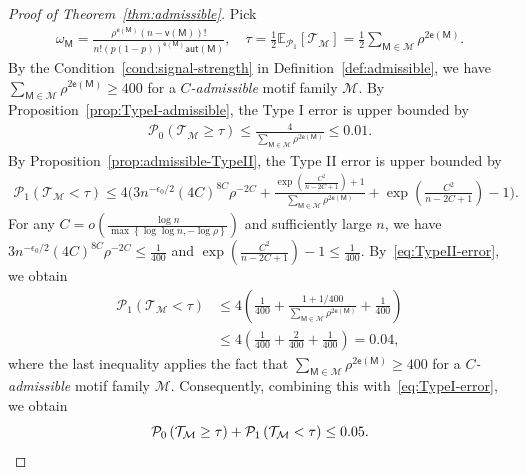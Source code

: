 \documentclass[letterpaper,11pt]{article}
\theoremstyle{definition}
\newcommand{\maM}{\mathcal{M}}
\newcommand{\maP}{\mathcal{P}}
\newcommand{\maT}{\mathcal{T}}
\newcommand{\en}{\mathsf{{e}}}
\newcommand{\vn}{\mathsf{{v}}}
\newcommand{\pth}[1]{\left( #1 \right)}
\newcommand{\qth}[1]{\left[ #1 \right]}
\newcommand{\sth}[1]{\left\{ #1 \right\}}
\newcommand{\sfM}{{\mathsf{M}}}
\newcommand{\aut}{\mathsf{aut}}
\def\E{\mathbb{E}}
\begin{document}
\begin{proof}[Proof of Theorem~\ref{thm:admissible}]
Pick \begin{align*}
    \omega_\sfM = \frac{\rho^{\en(\sfM)}(n-\vn(\sfM))!}{n!(p(1-p))^{\en(\sfM)}\aut(\sfM)},\quad \tau = \frac{1}{2}\E_{\maP_1}\qth{\maT_\maM} = \frac{1}{2}\sum_{\sfM\in\maM} \rho^{2\en(\sfM)}.
\end{align*}
By the Condition~\ref{cond:signal-strength} in Definition~\ref{def:admissible}, we have $\sum_{\sfM\in \maM} \rho^{2\en(\sfM)}\ge 400$ for a \emph{$C$-admissible} motif family $\maM$.
By Proposition~\ref{prop:TypeI-admissible}, the Type I error is upper bounded by \begin{align}\label{eq:TypeI-error}
    \maP_0\pth{\maT_\maM\ge \tau}\le \frac{4}{\sum_{\sfM\in \maM} \rho^{2\en(\sfM)}}\le 0.01.
\end{align}
By Proposition~\ref{prop:admissible-TypeII}, the Type II error is upper bounded by \begin{align}\label{eq:TypeII-error}
    \maP_1\pth{\maT_\maM<\tau}\le 4\Bigg(3n^{-\epsilon_0/2}(4C)^{8C}\rho^{-2C}+\frac{\exp\pth{\frac{C^2}{n-2C+1}}+1}{\sum_{\sfM\in \maM}\rho^{2\en(\sfM)}}+\exp\pth{\frac{C^2}{n-2C+1}}-1\Bigg).
\end{align}
For any $C = o\pth{\frac{\log n}{\max\sth{\log\log n,-\log\rho}}}$ and sufficiently large $n$, we have $3n^{-\epsilon_0/2}(4C)^{8C}\rho^{-2C}\le \frac{1}{400}$ and $\exp\pth{\frac{C^2}{n-2C+1}}-1\le \frac{1}{400}$. By~\eqref{eq:TypeII-error}, we obtain \begin{align*}
    \maP_1\pth{\maT_\maM<\tau}&\le 4\pth{\frac{1}{400}+\frac{1+1/400}{\sum_{\sfM\in \maM}\rho^{2\en(\sfM)}}+\frac{1}{400}}\\&\le 4\pth{\frac{1}{400}+\frac{2}{400}+\frac{1}{400}}=0.04,
\end{align*}
where the last inequality applies the fact that  $\sum_{\sfM\in \maM} \rho^{2\en(\sfM)}\ge 400$ for a \emph{$C$-admissible} motif family $\maM$.
Consequently, combining this with~\eqref{eq:TypeI-error}, we obtain 
\begin{equation*}
    \maP_0\pth{\maT_\maM\ge \tau}+\maP_1\pth{\maT_\maM<\tau}\le 0.05.\qedhere
\end{equation*}
\end{proof}
\end{document}
